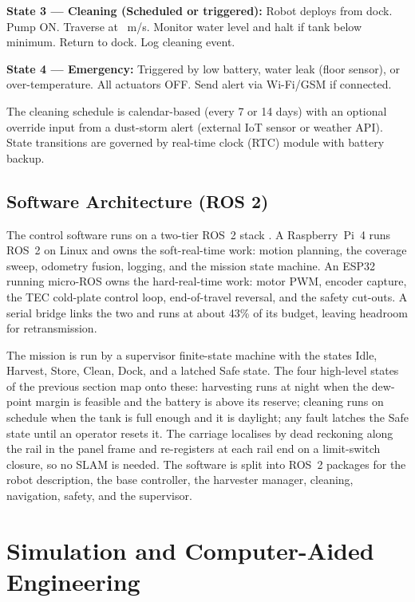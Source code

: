 \documentclass[12pt,a4paper]{report}   %
\begin{document}
\textbf{State 3 --- Cleaning (Scheduled or triggered):} Robot deploys from dock. Pump ON.
Traverse at \RobotSpeed~m/s. Monitor water level and halt if tank below minimum. Return to dock.
Log cleaning event.

\textbf{State 4 --- Emergency:} Triggered by low battery, water leak (floor sensor), or
over-temperature. All actuators OFF. Send alert via Wi-Fi/GSM if connected.

The cleaning schedule is calendar-based (every 7 or 14 days) with an optional override input
from a dust-storm alert (external IoT sensor or weather API). State transitions are governed by
real-time clock (RTC) module with battery backup.

\section{Software Architecture (ROS 2)}

The control software runs on a two-tier ROS~2 stack \cite{macenski2022ros2}. A
Raspberry~Pi~4 runs ROS~2 on Linux and owns the soft-real-time work: motion planning, the
coverage sweep, odometry fusion, logging, and the mission state machine. An ESP32 running
micro-ROS \cite{belsare2023microros} owns the hard-real-time work: motor PWM, encoder
capture, the TEC cold-plate control loop, end-of-travel reversal, and the safety cut-outs.
A serial bridge links the two and runs at about 43\% of its budget, leaving headroom for
retransmission.

The mission is run by a supervisor finite-state machine with the states Idle, Harvest,
Store, Clean, Dock, and a latched Safe state. The four high-level states of the previous
section map onto these: harvesting runs at night when the dew-point margin is feasible and
the battery is above its reserve; cleaning runs on schedule when the tank is full enough
and it is daylight; any fault latches the Safe state until an operator resets it. The
carriage localises by dead reckoning along the rail in the panel frame and re-registers at
each rail end on a limit-switch closure, so no SLAM is needed. The software is split into
ROS~2 packages for the robot description, the base controller, the harvester manager,
cleaning, navigation, safety, and the supervisor.

\chapter{Simulation and Computer-Aided Engineering}
\label{ch:sim}
\end{document}
